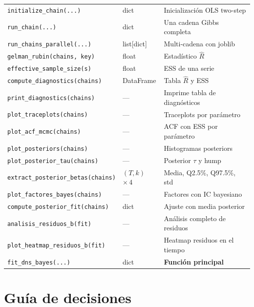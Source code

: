 \documentclass[12pt, a4paper]{article}
\theoremstyle{plain}
\theoremstyle{definition}
\theoremstyle{remark}
\begin{document}
\begin{table}[H]
\begin{tabular}{L{4cm} L{2.5cm} L{7.5cm}}
\texttt{initialize\_chain(...)} & dict & Inicialización OLS two-step \\
\texttt{run\_chain(...)} & dict & Una cadena Gibbs completa \\
\texttt{run\_chains\_parallel(...)} & list[dict] & Multi-cadena con joblib \\
\texttt{gelman\_rubin(chains, key)} & float & Estadístico $\hat{R}$ \\
\texttt{effective\_sample\_size(s)} & float & ESS de una serie \\
\texttt{compute\_diagnostics(chains)} & DataFrame & Tabla $\hat{R}$ y ESS \\
\texttt{print\_diagnostics(chains)} & — & Imprime tabla de diagnósticos \\
\texttt{plot\_traceplots(chains)} & — & Traceplots por parámetro \\
\texttt{plot\_acf\_mcmc(chains)} & — & ACF con ESS por parámetro \\
\texttt{plot\_posteriors(chains)} & — & Histogramas posteriors \\
\texttt{plot\_posterior\_tau(chains)} & — & Posterior $\tau$ y hump \\
\texttt{extract\_posterior\_betas(chains)} & $(T,k)$ $\times\,4$ & Media, Q2.5\%, Q97.5\%, std \\
\texttt{plot\_factores\_bayes(chains)} & — & Factores con IC bayesiano \\
\texttt{compute\_posterior\_fit(chains)} & dict & Ajuste con media posterior \\
\texttt{analisis\_residuos\_b(fit)} & — & Análisis completo de residuos \\
\texttt{plot\_heatmap\_residuos\_b(fit)} & — & Heatmap residuos en el tiempo \\
\texttt{fit\_dns\_bayes(...)} & dict & \textbf{Función principal} \\
\bottomrule
\end{tabular}
\end{table}

\section{Guía de decisiones}
\end{document}
